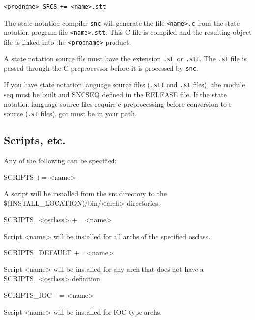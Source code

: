 \begin{verbatim}<prodname>_SRCS += <name>.stt
\end{verbatim}The state notation compiler \verb|snc| will generate the file \verb|<name>.c| from the state notation program file \verb|<name>.stt|. 
This C file is compiled and the resulting object file is linked into the \verb|<prodname>| product.

A state notation source file must have the extension \verb|.st |or \verb|.stt|. The \verb|.st| file is passed through the C preprocessor 
before it is processed by \verb|snc|.

If you have state notation language source files (\verb|.stt| and \verb|.st| files),  the module seq must be built and SNCSEQ defined 
in the RELEASE file. If the state notation language source files require c preprocessing before conversion to c source 
(\verb|.st| files), gcc must be in your path.

\subsection{Scripts, etc.}

Any of the following can be specified:

\begin{description}\item {}SCRIPTS += \textless{}name\textgreater{}

\end{description}A script will be installed from the src directory to the \$(INSTALL\_LOCATION)/bin/\textless{}arch\textgreater{} directories.

\begin{description}\item SCRIPTS\_\textless{}osclass\textgreater{} += \textless{}name\textgreater{}

\end{description}Script \textless{}name\textgreater{} will be installed for all archs of the specified osclass.

\begin{description}\item SCRIPTS\_DEFAULT += \textless{}name\textgreater{}

\end{description}Script \textless{}name\textgreater{} will be installed for any arch that does not have a SCRIPTS\_\textless{}osclass\textgreater{} definition

\begin{description}\item {}SCRIPTS\_IOC += \textless{}name\textgreater{}

\end{description}Script \textless{}name\textgreater{} will be installed for IOC type archs.

